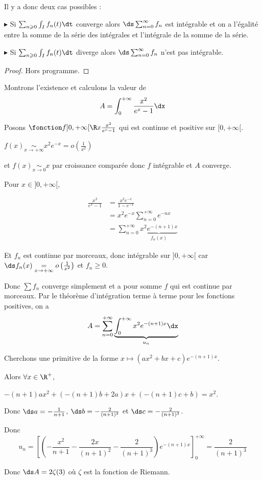 Il y a donc deux cas possibles : 

$\blacktriangleright$ Si $\sum_{n \geqslant 0} \int_I f_n(t) \dt$ converge alors $\ds \sum_{n = 0}^{\infty} f_n$ est intégrable 
et on a l'égalité entre la somme de la série des intégrales et l'intégrale de la somme de la série.

\avspace $\blacktriangleright$ Si $\sum_{n \geqslant 0} \int_I f_n(t) \dt$ diverge alors $\ds \sum_{n = 0}^{\infty} f_n$ n'est pas intégrable.

\begin{proof}
    Hors programme. 
\end{proof}

\begin{exemple}
    Montrons l'existence et calculons la valeur de
    $$ A = \int_{0}^{+ \infty} \frac{x^2}{e^x - 1} \dx$$ 

    Posons $\fonction f {]0, + \infty[}{\R}{x}{\frac{x^2}{e^x - 1}}$ qui est continue et positive sur $[0, + \infty[$.

    $f(x) \underset{x \to + \infty}{\sim} x^2 e^{-x} = o\left( \frac 1 {x^2} \right)$ 
    
    et $f(x) \underset{x \to 0 }{\sim} x$ par croissance comparée donc $f$ intégrable et $A$ converge. 

    \avspace Pour $x \in ]0, + \infty[$, 
    
    \begin{align}
        \frac{x^2}{e^x - 1 } & = \frac{x^2 e^{-x}}{1 - e^{-x}} \\
        & = x^2 e^{-x} \sum_{n = 0}^{+ \infty} e^{-nx} \\
        & = \sum_{n = 0}^{+ \infty} \underbrace{x^2 e^{-(n + 1)x}}_{f_n(x)}
    \end{align}

    Et $f_n$ est continue par morceaux, donc intégrable sur $]0, + \infty[$ car \\
    $\ds f_n(x) \underset{x \to + \infty}{=} o\left( \frac 1 {x^2} \right)$ et $f_n \geqslant 0$.

    Donc $\sum f_n$ converge simplement et a pour somme $f$ qui est continue par morceaux.
    Par le théorème d'intégration terme à terme pour les fonctions positives, on a
    $$A = \sum_{n = 0}^{+ \infty} \underbrace{\int_0^{+ \infty} x^2 e^{-(n + 1)x} \dx}_{u_n}$$

    Cherchons une primitive de la forme $x \mapsto (ax^2 + bx + c)e^{-(n + 1)x}$.

    Alors $\forall x \in \R^+$,

    $-(n+1)ax^2 + (-(n + 1)b + 2a)x + (-(n + 1)c + b) = x^2$.

    Donc $\ds a = - \frac 1 {n + 1}$, $\ds b = - \frac 2 {(n + 1)^2}$ et $\ds c = - \frac 2 {(n + 1)^3}$.

    Donc 
    $$u_n = \left[ \left( - \frac{x^2}{n + 1} - \frac{2x}{(n + 1)^2} - \frac{2}{(n + 1)^3} \right) e^{-(n + 1)x} \right]_0^{+ \infty} = \frac{2}{(n + 1)^3}$$

    Donc $\ds A = 2 \zeta(3)$ où $\zeta$ est la fonction de Riemann.
\end{exemple}

